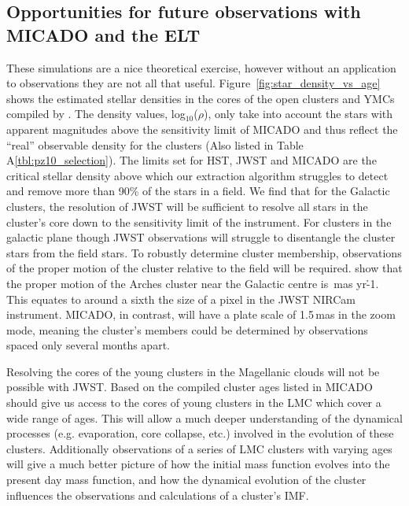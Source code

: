 \subsection{Opportunities for future observations with MICADO and the ELT}

These simulations are a nice theoretical exercise, however without an
application to observations they are not all that useful.
Figure~\ref{fig:star_density_vs_age} shows the estimated stellar densities in
the cores of the open clusters and YMCs compiled by \citet{portegies2010}. The
density values, log$_{10}$($\rho$), only take into account the stars with
apparent magnitudes above the sensitivity limit of MICADO and thus reflect the
``real'' observable density for the clusters (Also listed in Table
A\ref{tbl:pz10_selection}). The limits set for HST, JWST and MICADO are the
critical stellar density above which our extraction algorithm struggles to
detect and remove more than 90\% of the stars in a field. We find that for the
Galactic clusters, the resolution of JWST will be sufficient to resolve all
stars in the cluster's core down to the sensitivity limit of the instrument.
For clusters in the galactic plane though JWST observations will struggle to
disentangle the cluster stars from the field stars. To robustly determine
cluster membership, observations of the proper motion of the cluster relative to
the field will be required. \citet{stolte2008} show that the proper motion of
the Arches cluster near the Galactic centre is \,mas yr\h{-1}. This equates to around a
sixth the size of a pixel in the JWST NIRCam instrument. MICADO, in contrast,
will have a plate scale of 1.5\,mas in the zoom mode, meaning the cluster's
members could be determined by observations spaced only several months apart.

Resolving the cores of the young clusters in the Magellanic clouds will not be
possible with JWST. Based on the compiled cluster ages listed in \citet{portegies2010}
MICADO should give us access to the cores of young clusters in the LMC which
cover a wide range of ages. This will allow a much deeper understanding of the
dynamical processes (e.g. evaporation, core collapse, etc.) involved in the
evolution of these clusters. Additionally observations of a series of LMC
clusters with varying ages will give a much better picture of how the initial
mass function evolves into the present day mass function, and how the dynamical
evolution of the cluster influences the observations and calculations of a
cluster's IMF.


